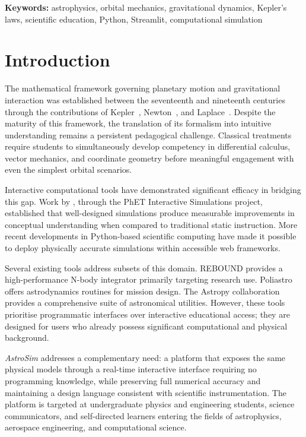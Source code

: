 \documentclass[10pt,a4paper]{article}
\begin{document}
\vspace{0.6em}
{\small
\textbf{Keywords:} astrophysics, orbital mechanics, gravitational dynamics,
Kepler's laws, scientific education, Python, Streamlit, computational simulation
}

\vspace{1em}

\section{Introduction}

The mathematical framework governing planetary motion and gravitational
interaction was established between the seventeenth and nineteenth centuries
through the contributions of Kepler~\citep{kepler1609}, Newton~\citep{newton1687},
and Laplace~\citep{laplace1799}.
Despite the maturity of this framework, the translation of its formalism into
intuitive understanding remains a persistent pedagogical challenge.
Classical treatments require students to simultaneously develop competency in
differential calculus, vector mechanics, and coordinate geometry before
meaningful engagement with even the simplest orbital scenarios.

Interactive computational tools have demonstrated significant efficacy in
bridging this gap.
Work by \citet{wieman2008}, through the PhET Interactive Simulations project,
established that well-designed simulations produce measurable improvements in
conceptual understanding when compared to traditional static instruction.
More recent developments in Python-based scientific computing
\citep{oliphant2007, hunter2007, virtanen2020} have made it possible to deploy
physically accurate simulations within accessible web frameworks.

Several existing tools address subsets of this domain.
REBOUND \citep{rein2012} provides a high-performance N-body integrator
primarily targeting research use.
Poliastro \citep{juan-zornoza2022} offers astrodynamics routines for mission
design.
The Astropy collaboration \citep{astropy2013, astropy2018} provides a
comprehensive suite of astronomical utilities.
However, these tools prioritise programmatic interfaces over interactive
educational access; they are designed for users who already possess
significant computational and physical background.

\textit{AstroSim} addresses a complementary need: a platform that exposes
the same physical models through a real-time interactive interface requiring
no programming knowledge, while preserving full numerical accuracy and
maintaining a design language consistent with scientific instrumentation.
The platform is targeted at undergraduate physics and engineering students,
science communicators, and self-directed learners entering the fields of
astrophysics, aerospace engineering, and computational science.
\end{document}
